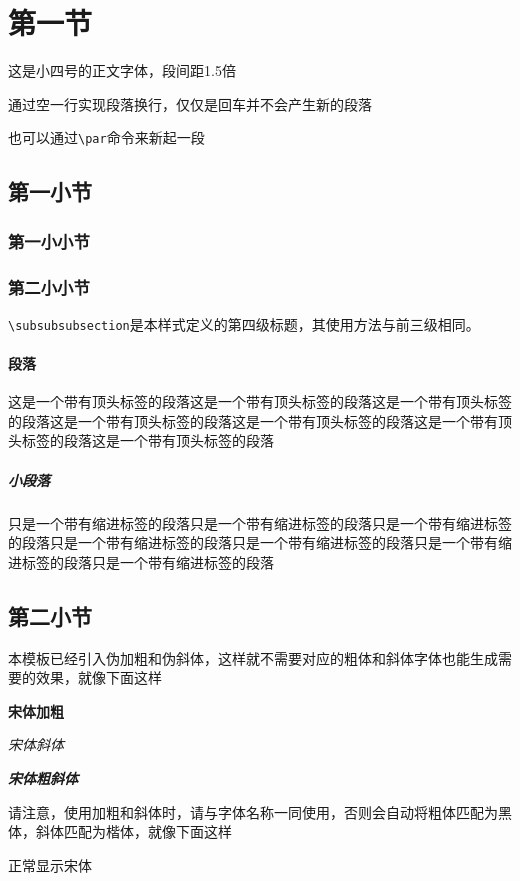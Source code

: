 \documentclass[supercite]{HustGraduPaper}
\begin{document}
	\clearpage%
	
	\section{第一节}
	这是小四号的正文字体，段间距1.5倍
	
	通过空一行实现段落换行，仅仅是回车并不会产生新的段落
	\par 也可以通过\verb|\par|命令来新起一段
	\subsection{第一小节}
	\subsubsection{第一小小节}
	\subsubsection{第二小小节}
	
	\verb|\subsubsubsection|是本样式定义的第四级标题，其使用方法与前三级相同。
	
	\paragraph{段落}\label{para:para}这是一个带有顶头标签的段落这是一个带有顶头标签的段落这是一个带有顶头标签的段落这是一个带有顶头标签的段落这是一个带有顶头标签的段落这是一个带有顶头标签的段落这是一个带有顶头标签的段落
	\subparagraph{小段落}只是一个带有缩进标签的段落只是一个带有缩进标签的段落只是一个带有缩进标签的段落只是一个带有缩进标签的段落只是一个带有缩进标签的段落只是一个带有缩进标签的段落只是一个带有缩进标签的段落
	\subsection{第二小节}
	本模板已经引入伪加粗和伪斜体，这样就不需要对应的粗体和斜体字体也能生成需要的效果，就像下面这样
	
	{\songti \bfseries 宋体加粗}
	
	{\songti \itshape 宋体斜体}
	
	{\songti \bfseries \itshape 宋体粗斜体}
	
	请注意，使用加粗和斜体时，请与字体名称一同使用，否则会自动将粗体匹配为黑体，斜体匹配为楷体，就像下面这样
	
	{正常显示宋体}
	
\end{document}
